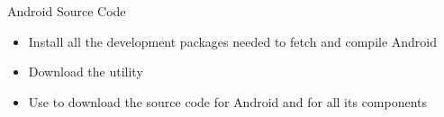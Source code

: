 \setuplabframe
{Android Source Code}
{
  \begin{itemize}
  \item Install all the development packages needed to fetch and
    compile Android
  \item Download the  utility
  \item Use  to download the source code for Android and
    for all its components
  \end{itemize}
}
